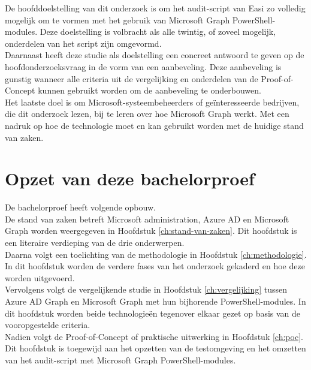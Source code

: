 
De hoofddoelstelling van dit onderzoek is om het audit-script van Easi zo volledig mogelijk om te vormen met het gebruik van Microsoft Graph PowerShell-modules. Deze doelstelling is volbracht als alle twintig, of zoveel mogelijk, onderdelen van het script zijn omgevormd. \\

Daarnaast heeft deze studie als doelstelling een concreet antwoord te geven op de hoofdonderzoeksvraag in de vorm van een aanbeveling. Deze aanbeveling is gunstig wanneer alle criteria uit de vergelijking en onderdelen van de Proof-of-Concept kunnen gebruikt worden om de aanbeveling te onderbouwen. \\

Het laatste doel is om Microsoft-systeembeheerders of geïnteresseerde bedrijven, die dit onderzoek lezen, bij te leren over hoe Microsoft Graph werkt. Met een nadruk op hoe de technologie moet en kan gebruikt worden met de huidige stand van zaken. 

\section{Opzet van deze bachelorproef}%
\label{sec:opzet-bachelorproef}


De bachelorproef heeft volgende opbouw. \\

De stand van zaken betreft Microsoft administration, Azure \ac{AD} en Microsoft Graph worden weergegeven in Hoofdstuk \ref{ch:stand-van-zaken}. Dit hoofdstuk is een literaire verdieping van de drie onderwerpen. \\

Daarna volgt een toelichting van de methodologie in Hoofdstuk \ref{ch:methodologie}. In dit hoofdstuk worden de verdere fases van het onderzoek gekaderd en hoe deze worden uitgevoerd. \\

Vervolgens volgt de vergelijkende studie in Hoofdstuk \ref{ch:vergelijking} tussen Azure \Ac{AD} Graph en Microsoft Graph met hun bijhorende PowerShell-modules. In dit hoofdstuk worden beide technologieën tegenover elkaar gezet op basis van de vooropgestelde criteria. \\

Nadien volgt de Proof-of-Concept of praktische uitwerking in Hoofdstuk \ref{ch:poc}. Dit hoofdstuk is toegewijd aan het opzetten van de testomgeving en het omzetten van het audit-script met Microsoft Graph PowerShell-modules. \\

